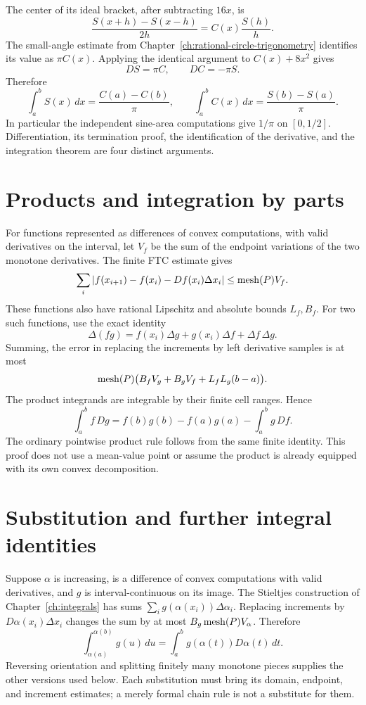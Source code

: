 The center of its ideal bracket, after subtracting $16x$, is
\[
 \frac{S(x+h)-S(x-h)}{2h}=C(x)\frac{S(h)}h.
\]
The small-angle estimate from Chapter~\ref{ch:rational-circle-trigonometry}
identifies its value as $\pi C(x)$.  Applying the identical argument to
$C(x)+8x^2$ gives
\[
 DS=\pi C,\qquad DC=-\pi S.
\]
Therefore
\[
 \int_a^b S(x)\,dx=\frac{C(a)-C(b)}\pi,\qquad
 \int_a^b C(x)\,dx=\frac{S(b)-S(a)}\pi.
\]
In particular the independent sine-area computations give $1/\pi$ on
$[0,1/2]$.  Differentiation, its termination proof, the identification of
the derivative, and the integration theorem are four distinct arguments.

\section{Products and integration by parts}
For functions represented as differences of convex computations, with
valid derivatives on the interval, let $V_f$ be the sum of the endpoint
variations of the two monotone derivatives.  The finite FTC estimate gives
\[
 \sum_i|f(x_{i+1})-f(x_i)-Df(x_i)\Delta x_i|
       \le\operatorname{mesh}(P)V_f.
\]
These functions also have rational Lipschitz and absolute bounds $L_f,B_f$.
For two such functions, use the exact identity
\[
 \Delta(fg)=f(x_i)\Delta g+g(x_i)\Delta f+\Delta f\,\Delta g.
\]
Summing, the error in replacing the increments by left derivative samples
is at most
\[
 \operatorname{mesh}(P)\bigl(B_fV_g+B_gV_f+L_fL_g(b-a)\bigr).
\]
The product integrands are integrable by their finite cell ranges.  Hence
\[
 \boxed{\int_a^b f\,Dg=f(b)g(b)-f(a)g(a)-\int_a^b g\,Df.}
\]
The ordinary pointwise product rule follows from the same finite identity.
This proof does not use a mean-value point or assume the product is already
equipped with its own convex decomposition.

\section{Substitution and further integral identities}
Suppose $\alpha$ is increasing, is a difference of convex computations
with valid derivatives, and $g$ is interval-continuous on its image.
The Stieltjes construction of Chapter~\ref{ch:integrals} has sums
$\sum_i g(\alpha(x_i))\Delta\alpha_i$.  Replacing increments by
$D\alpha(x_i)\Delta x_i$ changes the sum by at most
$B_g\operatorname{mesh}(P)V_\alpha$.  Therefore
\[
 \int_{\alpha(a)}^{\alpha(b)}g(u)\,du
   =\int_a^b g(\alpha(t))D\alpha(t)\,dt.
\]
Reversing orientation and splitting finitely many monotone pieces supplies
the other versions used below.  Each substitution must bring its domain,
endpoint, and increment estimates; a merely formal chain rule is not a
substitute for them.

